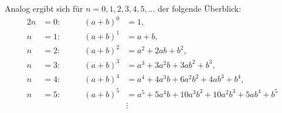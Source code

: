 Analog ergibt sich für $n=0,1,2,3,4,5,\ldots$ der folgende Überblick:
\begin{alignat*}{2}
  n&=0:\qquad &(a+b)^0&=1,\\
  n&=1:\qquad &(a+b)^1&=a+b,\\
  n&=2:\qquad &(a+b)^2&=a^2+2ab+b^2,\\
  n&=3:\qquad &(a+b)^3&=a^3+3a^2b+3ab^2+b^3,\\
  n&=4:\qquad &(a+b)^4&=a^4+4a^3b+6a^2b^2+4ab^3+b^4,\\
  n&=5:\qquad &(a+b)^5&=a^5+5a^4b+10a^3b^2+10a^2b^3+5ab^4+b^5 \\
   &&&\vdots
\end{alignat*}



